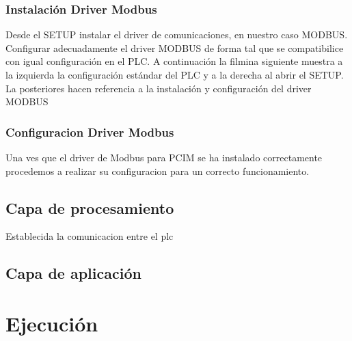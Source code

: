 \subsubsection{Instalación Driver Modbus}
Desde el SETUP instalar el driver de comunicaciones, en nuestro caso MODBUS.
Configurar adecuadamente el driver MODBUS de forma tal que se compatibilice con igual configuración en el PLC.
A continuación la filmina siguiente muestra a la izquierda la configuración estándar del PLC y  a la derecha al abrir el SETUP.
La posteriores hacen referencia a la instalación y configuración del driver MODBUS
\subsubsection{Configuracion Driver Modbus}
Una ves que el driver de Modbus para PCIM se ha instalado correctamente procedemos a realizar su 
configuracion para un correcto funcionamiento.

\subsection{Capa de procesamiento}
\label{subsec:CapaProcesamiento}
Establecida la comunicacion entre el \gls{plc}


\subsection{Capa de aplicación}
\label{subsec:CapaAplicacion}


\section{Ejecución}
\label{sec:Ejecucion}
